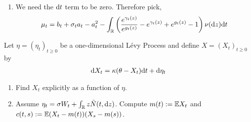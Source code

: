 \documentclass[10pt]{article}
\begin{document}
\begin{solution}[Solution]
\begin{enumerate}[label=(\alph*)]
    \item 
        We need the \( \mathrm{d} t \) term to be zero. Therefore pick,
        \begin{align*}
            \mu_t = b_t + \sigma_t a_t - a_t^2
            -\int_{\mathbb{R}} \left( \dfrac{e^{\gamma_t(z)}}{e^{g_t(z)}} - e^{\gamma_t(z)}+e^{g_t(z)}-1 \right) \nu(\mathrm{d} z)\mathrm{d} t
        \end{align*}
\end{enumerate}
\end{solution}

\begin{problem}[Exercise 10.4]
    Let \( \eta = (\eta_t)_{t\geq 0} \) be a one-dimensional L\'evy Process and define \( X = (X_t)_{t\geq 0} \) by
    \begin{align*}
        \mathrm{d} X_t = \kappa(\theta - X_t)\mathrm{d} t + \mathrm{d} \eta_t
    \end{align*}
    
    \begin{enumerate}[label=(\alph*)]
        \item Find \( X_t \) explicitly as a function of \( \eta \).
        \item Assume \( \eta_t = \sigma  W_t + \int_{\mathbb{R}} z \tilde{N}(t,\mathrm{d} z) \). Compute \( m(t):= \mathbb{E} X_t \) and \( c(t,s):= \mathbb{E}(X_t-m(t))(X_s-m(s)) \).
    \end{enumerate}
\end{problem}
\end{document}
